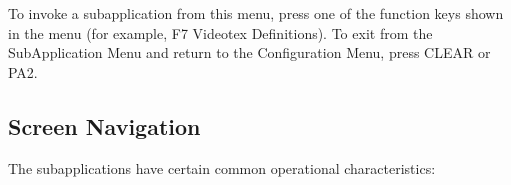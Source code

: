 \documentclass[letterpaper,10pt,english]{sphinxmanual}
\begin{document}
\sphinxAtStartPar
{}

\sphinxAtStartPar
To invoke a sub\sphinxhyphen{}application from this menu, press one of the function keys shown in the menu (for example, F7 \textendash{} Videotex Definitions). To exit from the Sub\sphinxhyphen{}Application Menu and return to the Configuration Menu, press CLEAR or PA2.

\ignorespaces 

\subsection{Screen Navigation}
\label{\detokenize{connectivity_guide:screen-navigation}}\label{\detokenize{connectivity_guide:index-3}}
\sphinxAtStartPar
The sub\sphinxhyphen{}applications have certain common operational characteristics:
\end{document}
